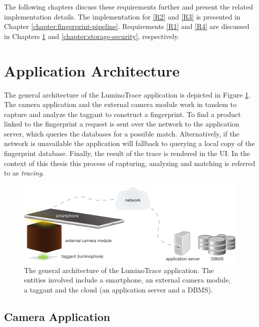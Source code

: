 \documentclass[thesis.tex]{subfiles}
\begin{document}
\noindent The following chapters discuss these requirements further and present the related implementation details. The implementation for \ref{R2} and \ref{R3} is presented in Chapter \ref{chapter:fingerprint-pipeline}. Requirements \ref{R1} and \ref{R4} are discussed in Chapters \ref{chapter:application-architecture} and \ref{chapter:storage-security}, respectively.

\section{Application Architecture}
\label{chapter:application-architecture}

The general architecture of the LuminoTrace application is depicted in Figure \ref{figure:architecture}. The camera application and the external camera module work in tandem to capture and analyze the taggant to construct a fingerprint. To find a product linked to the fingerprint a request is sent over the network to the application server, which queries the databases for a possible match. Alternatively, if the network is unavailable the application will fallback to querying a local copy of the fingerprint database. Finally, the result of the trace is rendered in the UI. In the context of this thesis this process of capturing, analyzing and matching is referred to as \emph{tracing}.

\clearpage

\begin{figure}[h]
\centering \includegraphics[width=13.5cm]{images/design_implementation/architecture.pdf}
\caption{The general architecture of the LuminoTrace application. The entities involved include a smartphone, an external camera module, a taggant and the cloud (an application server and a DBMS). \label{figure:architecture}}
\end{figure}

\subsection{Camera Application}
\label{chapter:camera-application}
\end{document}
